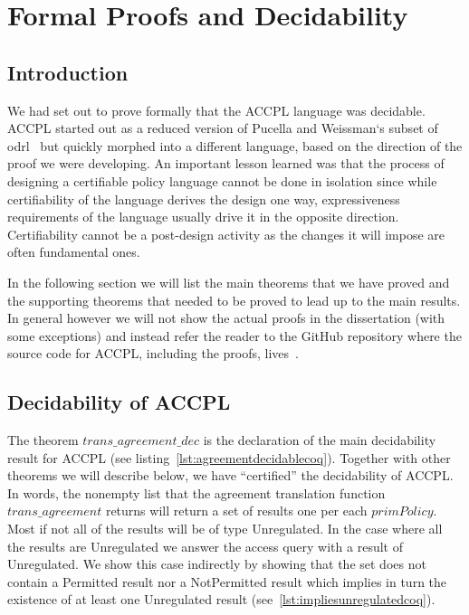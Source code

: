 \chapter{Formal Proofs and Decidability}\label{chap:results}

                  
\section{Introduction}\label{sec:introresults}


We had set out to prove formally that the \ac{ACCPL} language was decidable. \ac{ACCPL} started out as a reduced version of Pucella and Weissman`s subset of \ac{odrl}~\cite{pucella2006} but quickly morphed into a different language, based on the direction of the proof we were developing. An important lesson learned was that the process of designing a certifiable policy language cannot be done in isolation since while certifiability of the language derives the design one way, expressiveness requirements of the language usually drive it in the opposite direction. Certifiability cannot be a post-design activity as the changes it will impose are often fundamental ones.

In the following section we will list the main theorems that we have proved and the supporting theorems that needed to be proved to lead up to the main results. In general however we will not show the actual proofs in the dissertation (with some exceptions) and instead refer the reader to the GitHub repository where the source code for \ac{ACCPL}, including the proofs, lives~\cite{BahmanSistany2015}.

\section{Decidability of ACCPL}\label{sec:maintheorems}

The theorem $trans\_agreement\_dec$ is the declaration of the main decidability result for \ac{ACCPL} (see listing~\ref{lst:agreementdecidablecoq}). Together with other theorems we will describe below, we have ``certified'' the decidability of \ac{ACCPL}. In words, the nonempty list that the agreement translation function $trans\_agreement$ returns will return a set of results one per each $primPolicy$. Most if not all of the results will be of type Unregulated. In the case where all the results are Unregulated we answer the access query with a result of Unregulated. We show this case indirectly by showing that the set does not contain a Permitted result nor a NotPermitted result which implies in turn the existence of at least one Unregulated result (see~\ref{lst:impliesunregulatedcoq}).

